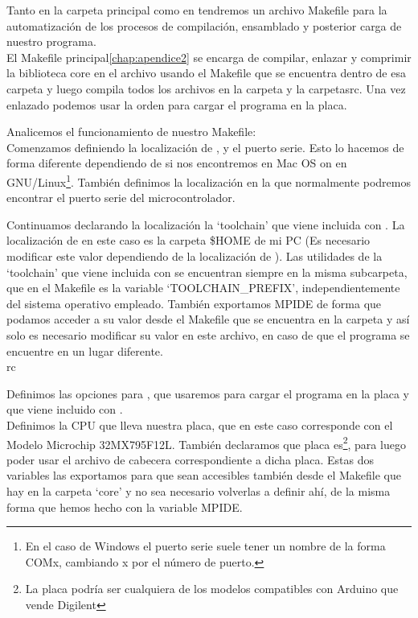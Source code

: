 Tanto en la carpeta principal como en  tendremos un archivo Makefile para la automatización de los procesos de compilación, ensamblado y posterior carga de nuestro programa.\\
El Makefile principal\ref{chap:apendice2} se encarga de compilar, enlazar y comprimir la biblioteca core en el archivo  usando el Makefile que se encuentra dentro de esa carpeta y luego compila todos los archivos en la carpeta  y la carpeta{src}. Una vez enlazado podemos usar la orden  para cargar el programa en la placa.

Analicemos el funcionamiento de nuestro Makefile:\\

Comenzamos definiendo la localización de ,  y el puerto serie. Esto lo hacemos de forma diferente dependiendo de si nos encontremos en Mac OS on en GNU/Linux\protect\footnote{En el caso de Windows el puerto serie suele tener un nombre de la forma COMx, cambiando x por el número de puerto.}. También definimos la localización en la que normalmente podremos encontrar el puerto serie del microcontrolador.


Continuamos declarando la localización la `toolchain' que viene incluida con . La localización de  en este caso es la carpeta \$HOME de mi PC (Es necesario modificar este valor dependiendo de la localización de ). Las utilidades de la `toolchain' que viene incluida con  se encuentran siempre en la misma subcarpeta, que en el Makefile es la variable `TOOLCHAIN\_PREFIX', independientemente del sistema operativo empleado. También exportamos MPIDE de forma que podamos acceder a su valor desde el Makefile que se encuentra en la carpeta  y así solo es necesario modificar su valor en este archivo, en caso de que el programa se encuentre en un lugar diferente.\\
rc

Definimos las opciones para , que usaremos para cargar el programa en la placa y que viene incluido con .\\


Definimos la CPU que lleva nuestra placa, que en este caso corresponde con el Modelo Microchip 32MX795F12L. También declaramos que placa es\protect\footnote{La placa podría ser cualquiera de los modelos compatibles con Arduino que vende Digilent}, para luego poder usar el archivo de cabecera correspondiente a dicha placa. Estas dos variables las exportamos para que sean accesibles también desde el Makefile que hay en la carpeta `core' y no sea necesario volverlas a definir ahí, de la misma forma que hemos hecho con la variable MPIDE.\\

